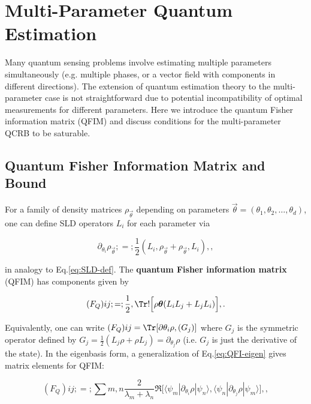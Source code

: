 \section{Multi-Parameter Quantum Estimation}

\label{sec:multiparam}



Many quantum sensing problems involve estimating multiple parameters
simultaneously (e.g. multiple phases, or a vector field with
components in different directions). The extension of quantum
estimation theory to the multi-parameter case is not straightforward
due to potential incompatibility of optimal measurements for different
parameters. Here we introduce the quantum Fisher information matrix
(QFIM) and discuss conditions for the multi-parameter QCRB to be
saturable.



\subsection{Quantum Fisher Information Matrix and Bound}



For a family of density matrices $\rho_{\vec{\theta}}$ depending on
parameters $\vec{\theta} = (\theta_1,\theta_2,\ldots,\theta_d)$, one
can define SLD operators $L_i$ for each parameter via

\begin{equation}
\partial_{\theta_i} \rho_{\vec{\theta}} ;=; \frac{1}{2}(L_i,\rho_{\vec{\theta}} + \rho_{\vec{\theta}},L_i) ,,
\end{equation}

in analogy to Eq.\eqref{eq:SLD-def}. The \textbf{quantum Fisher information matrix} (QFIM) has components given by

\begin{equation}
(F_Q){ij} ;=; \frac{1}{2}, \Tr!\Big[\rho{\vec{\theta}} (L_i L_j + L_j L_i)\Big] ,.
\label{eq:QFIM-def}
\end{equation}

Equivalently, one can write $(F_Q){ij} = \Tr[\partial{\theta_i}\rho, (G_j)]$ where $G_j$ is the symmetric operator defined by $G_j = \frac{1}{2}(L_j \rho + \rho L_j) = \partial_{\theta_j}\rho$ (i.e. $G_j$ is just the derivative of the state). In the eigenbasis form, a generalization of Eq.\eqref{eq:QFI-eigen} gives matrix elements for QFIM:

\begin{equation}
(F_Q){ij} ;=; \sum{m,n} \frac{2}{\lambda_m + \lambda_n} \Re\big[\langle \psi_m|\partial_{\theta_i}\rho|\psi_n\rangle, \langle \psi_n|\partial_{\theta_j}\rho|\psi_m\rangle\big] ,,
\end{equation}

